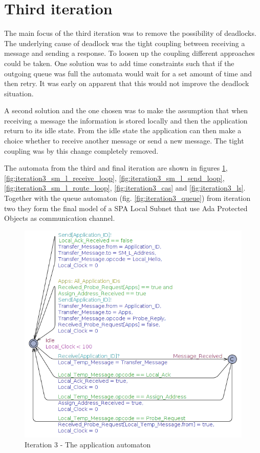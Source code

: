 \section{Third iteration}
The main focus of the third iteration was to remove the possibility of
deadlocks. The underlying cause of deadlock was the tight coupling between
receiving a message and sending a response. To loosen up the coupling different
approaches could be taken. One solution was to add time constraints such that if
the outgoing queue was full the automata would wait for a set amount of time
and then retry. It was early on apparent that this would not improve the
deadlock situation.

A second solution and the one chosen was to make the assumption that when
receiving a message the information is stored locally and then the application
return to its idle state. From the idle state the application can then make a
choice whether to receive another message or send a new message. The tight
coupling was by this change completely removed.

The automata from the third and final iteration are shown in figures
\ref{fig:iteration3_app}, \ref{fig:iteration3_sm_l_receive_loop},
\ref{fig:iteration3_sm_l_send_loop}, \ref{fig:iteration3_sm_l_route_loop},
\ref{fig:iteration3_cas} and \ref{fig:iteration3_ls}. Together with the queue
automaton (fig. \ref{fig:iteration3_queue}) from iteration two they form the
final model of a SPA Local Subnet that use Ada Protected Objects as
communication channel.

\begin{figure}[ht]
    \centering
    \includegraphics[width=\textwidth]{figures/iteration3_app}
    \caption{Iteration 3 - The application automaton}
    \label{fig:iteration3_app}
\end{figure}

